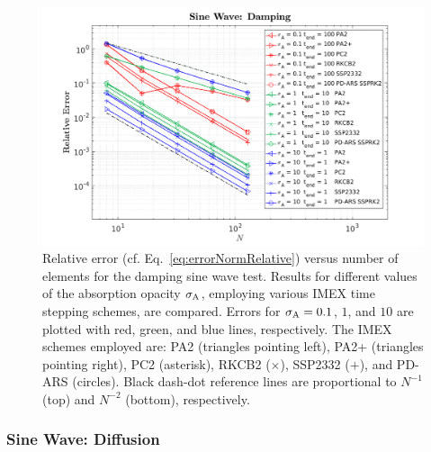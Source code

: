 \begin{figure}[H]
  \centering
    \includegraphics[width=\textwidth]{figures/SineWaveDamping}
   \caption{Relative error (cf. Eq.~\eqref{eq:errorNormRelative}) versus number of elements for the damping sine wave test.  Results for different values of the absorption opacity $\sigma_{{\rm A}}$, employing various IMEX time stepping schemes, are compared.  Errors for $\sigma_{{\rm A}}=0.1$, $1$, and $10$ are plotted with red, green, and blue lines, respectively.  The IMEX schemes employed are: PA2 (triangles pointing left), PA2+ (triangles pointing right), PC2 (asterisk), RKCB2 ($\times$), SSP2332 ($+$), and PD-ARS (circles).  Black dash-dot reference lines are proportional to $N^{-1}$ (top) and $N^{-2}$ (bottom), respectively.}
  \label{fig:SineWaveDamping}
\end{figure}

\subsubsection{Sine Wave: Diffusion}

